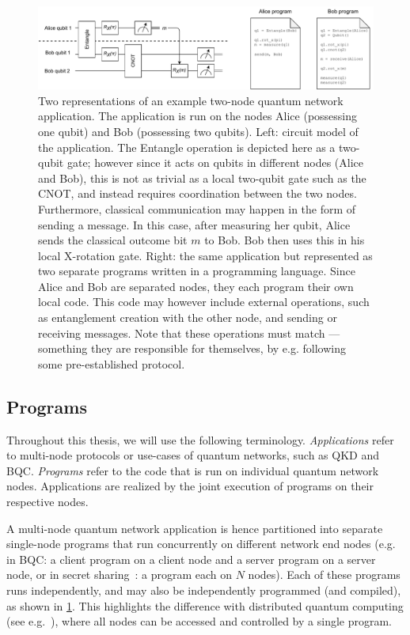 \begin{figure}[t]
    \centering
    \includegraphics[width=1.0\textwidth]{figures/background/2node_circuit.pdf}
    \caption{
        Two representations of an example two-node quantum network application.
        The application is run on the nodes Alice (possessing one qubit) and Bob (possessing two qubits).
        Left: circuit model of the application.
        The Entangle operation is depicted here as a two-qubit gate; however since it acts on qubits in different nodes (Alice and Bob),
        this is not as trivial as a local two-qubit gate such as the CNOT, and instead requires coordination between the two nodes.
        Furthermore, classical communication may happen in the form of sending a message.
        In this case, after measuring her qubit, Alice sends the classical outcome bit $m$ to Bob.
        Bob then uses this in his local X-rotation gate.
        Right: the same application but represented as two separate programs written in a programming language.
        Since Alice and Bob are separated nodes, they each program their own local code.
        This code may however include external operations, such as entanglement creation with the other node, and sending or receiving messages.
        Note that these operations must match --- something they are responsible for themselves, by e.g. following some pre-established protocol.
    }
    \label{background:fig:2node_circuit}
\end{figure}


\subsection{Programs}
Throughout this thesis, we will use the following terminology.
\emph{Applications} refer to multi-node protocols or use-cases of quantum networks, such as QKD and BQC.
\emph{Programs} refer to the code that is run on individual quantum network nodes.
Applications are realized by the joint execution of programs on their respective nodes.

A multi-node quantum network application is hence partitioned into separate single-node programs that run concurrently on different network end nodes (e.g. in BQC: a client program on a client node and a server program on a server node, or in secret sharing~\cite{hillery1999quantum}: a program each on $N$ nodes).
Each of these programs runs independently, and may also be independently programmed (and compiled), as shown in \cref{background:fig:2node_circuit}.
This highlights the difference with distributed quantum computing (see e.g.~\cite{cacciapuoti2019quantum}), where all nodes can be accessed and controlled by a single program. 


